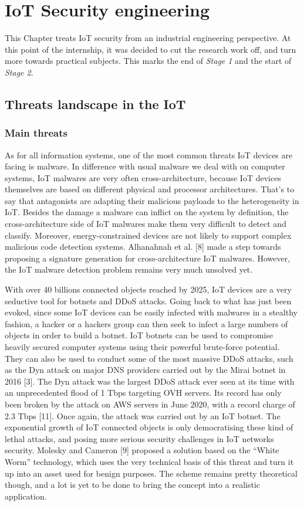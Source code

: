 \chapter{IoT Security engineering}
\label{chap:iot_security}

This Chapter treats IoT security from an industrial engineering perspective. At this point of the internship, it was decided to cut the research work off, and turn more towards practical subjects. This marks the end of \emph{Stage 1} and the start of \emph{Stage 2}.

\section{Threats landscape in the IoT}

\subsection{Main threats}

As for all information systems, one of the most common threats IoT devices are facing is malware. In difference with usual malware we deal with on computer systems, IoT malwares are very often cross-architecture, because IoT devices themselves are based on different physical and processor architectures. That’s to say that antagonists are adapting their malicious payloads to the heterogeneity in IoT. Besides the damage a malware can inflict on the system by definition, the cross-architecture side of IoT malwares make them very difficult to detect and classify. Moreover, energy-constrained devices are not likely to support complex malicious code detection systems. Alhanahnah et al. [8] made a step towards proposing a signature generation for cross-architecture IoT malwares. However, the IoT malware detection problem remains very much unsolved yet.

With over 40 billions connected objects reached by 2025, IoT devices are a very seductive tool for botnets and DDoS attacks. Going back to what has just been evoked, since some IoT devices can be easily infected with malwares in a stealthy fashion, a hacker or a hackers group can then seek to infect a large numbers of objects in order to build a botnet. IoT botnets can be used to compromise heavily secured computer systems using their powerful brute-force potential. They can also be used to conduct some of the most massive DDoS attacks, such as the Dyn attack on major DNS providers carried out by the Mirai botnet in 2016 [3]. The Dyn attack was the largest DDoS attack ever seen at its time with an unprecedented flood of 1 Tbps targeting OVH servers. Its record has only been broken by the attack on AWS servers in June 2020, with a record charge of 2.3 Tbps [11]. Once again, the attack was carried out by an IoT botnet. The exponential growth of IoT connected objects is only democratising these kind of lethal attacks, and posing more serious security challenges in IoT networks security. Molesky and Cameron [9] proposed a solution based on the “White Worm” technology, which uses the very technical basis of this threat and turn it up into an asset used for benign purposes. The scheme remains pretty theoretical though, and a lot is yet to be done to bring the concept into a realistic application.

